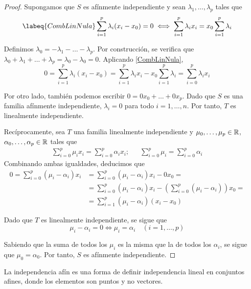 \begin{proof}
Supongamos que $S$ es afínmente independiente y sean $\lambda_1,\dots,
\lambda_p$ tales que
\begin{equation}
\labeq{CombLinNula}
\sum^p_{i=1}\lambda_i(x_i-x_0)=0 \iff
\sum^p_{i=1}\lambda_ix_i=x_0\sum^p_{i=1}\lambda_i
\end{equation}

Definimos $\lambda_0=-\lambda_1-\dots-\lambda_p$. Por construcción, se
verifica que $\lambda_0+\lambda_1+\dots+\lambda_p=\lambda_0-\lambda_0=0$.
Aplicando \eqref{CombLinNula},
\[0=\sum^p_{i=1}\lambda_i(x_i-x_0)=
\sum^p_{i=1}\lambda_i x_i-x_0\sum^p_{i=1}\lambda_i=
\sum^p_{i=0}\lambda_i x_i\]

Por otro lado, también podemos escribir $0=0x_0+\dots+0x_p$. Dado que $S$ es una
familia afínmente independiente, $\lambda_i=0$ para todo $i=1,\dots,n$.
Por tanto, $T$ es linealmente independiente.

Recíprocamente, sea $T$ una familia linealmente independiente y
$\mu_0,\dots,\mu_p \in \mathbb{R}$, $\alpha_0,\dots,\alpha_p \in \mathbb{R}$ tales que
\begin{align*}
\sum_{i=0}^p \mu_ix_i=\sum_{i=0}^p \alpha_ix_i;
&&
\sum_{i=0}^p \mu_i=\sum_{i=0}^p \alpha_i
\end{align*}
Combinando ambas igualdades, deducimos que
\begin{align*}
0=\sum^p_{i=0}(\mu_i-\alpha_i)x_i
	&=\sum^p_{i=0}(\mu_i-\alpha_i)x_i-0x_0=\\
	&=\sum^p_{i=0}(\mu_i-\alpha_i)x_i-
	\left(\sum^p_{i=0}(\mu_i-\alpha_i)\right)x_0=\\
	&=\sum^p_{i=1}(\mu_i-\alpha_i)(x_i-x_0)
\end{align*}

Dado que $T$ es linealmente independiente, se sigue que
\[\mu_i-\alpha_i=0 \iff \mu_i=\alpha_i \quad (i=1,\dots, p)\]

Sabiendo que la suma de todos los $\mu_i$ es la misma que la de todos los
$\alpha_i$, se sigue que $\mu_0=\alpha_0$. Por tanto, $S$ es afínmente
independiente.
\end{proof}

\begin{marginfigure}
\caption[Puntos afínmente independientes]{La independencia afín es una forma de definir independencia lineal
en conjuntos afines, donde los elementos son puntos y no vectores.}
\end{marginfigure}

